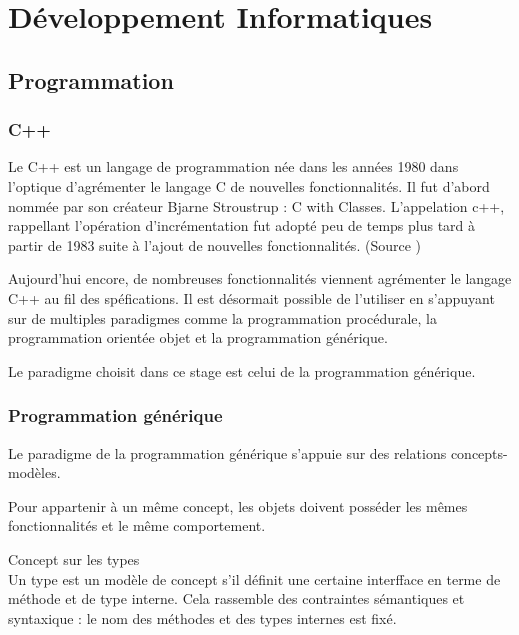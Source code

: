 \section{Développement Informatiques}

\subsection{Programmation}

\subsubsection{C++}


Le C++ est un langage de programmation née dans les années 1980 dans l'optique d'agrémenter le langage C de nouvelles fonctionnalités. Il fut d'abord nommée par son créateur Bjarne Stroustrup : C with Classes. L'appelation c++, rappellant l'opération d'incrémentation fut adopté peu de temps plus tard à partir de 1983 suite à l'ajout de nouvelles fonctionnalités. (Source \cite{Wiki-cpp})

Aujourd'hui encore, de nombreuses fonctionnalités viennent agrémenter le langage C++ au fil des spéfications. Il est désormait possible de l'utiliser en s'appuyant sur de multiples paradigmes comme la programmation procédurale, la programmation orientée objet et la programmation générique.

Le paradigme choisit dans ce stage est celui de la programmation générique. \cite{troussil-cpp}

\subsubsection{Programmation générique}


Le paradigme de la programmation générique s'appuie sur des relations concepts-modèles. 

Pour appartenir à un même concept, les objets doivent posséder les mêmes fonctionnalités et le même comportement. 

\begin{Definition}{Concept sur les types}\\
\label{def:cpp-con}
    Un type est un modèle de concept s'il définit une certaine interfface en terme de méthode et de type interne. Cela rassemble des contraintes sémantiques et syntaxique : le nom des méthodes et des types internes est fixé.
\end{Definition}

